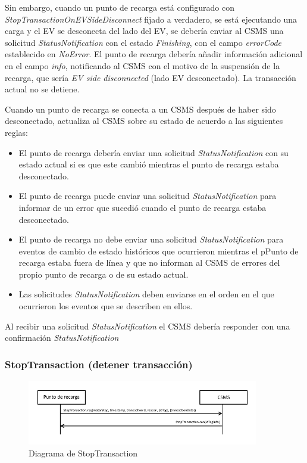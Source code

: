 \documentclass[12pt,a4paper,onecolumn,oneside]{report}
\begin{document}
Sin embargo, cuando un punto de recarga está configurado con \textit{StopTransactionOnEVSideDisconnect} fijado a verdadero, se
está ejecutando una carga y el EV se desconecta del lado del EV, se debería enviar al CSMS una solicitud \textit{StatusNotification} con el estado \textit{Finishing}, con el campo \textit{errorCode} establecido en \textit{NoError}. El punto de recarga debería añadir información adicional en el campo \textit{info}, notificando al CSMS con el motivo de la suspensión de la recarga, que sería \textit{EV side disconnected} (lado EV desconectado). La transacción actual no se detiene.

Cuando un punto de recarga se conecta a un CSMS después de haber sido desconectado, actualiza al CSMS sobre su estado de acuerdo a las siguientes reglas:

\begin{itemize}
\item El punto de recarga debería enviar una solicitud \textit{StatusNotification} con su estado actual si es que este cambió mientras el punto de recarga estaba desconectado.
\item El punto de recarga puede enviar una solicitud \textit{StatusNotification} para informar de un error que sucedió cuando el punto de recarga estaba desconectado.
\item El punto de recarga no debe enviar una solicitud \textit{StatusNotification} para eventos de cambio de estado históricos que
ocurrieron mientras el pPunto de recarga estaba fuera de línea y que no informan al CSMS de errores del propio punto de recarga o de su estado actual.
\item Las solicitudes \textit{StatusNotification} deben enviarse en el orden en el que ocurrieron los eventos que se describen en ellos.

\end{itemize}

Al recibir una solicitud \textit{StatusNotification} el CSMS debería responder con una confirmación \textit{StatusNotification}

\subsubsection{StopTransaction (detener transacción)}
\label{StopTransaction (detener transacción)}


\begin{figure}[h] 
\centering
  \includegraphics[width=0.9\textwidth]{figuras/diagramastoptransaction.png}
  \caption[Diagrama de \textit{StopTransaction}]{Diagrama de StopTransaction\\
  }
  \label{fig:diagramastoptransaction}
\end{figure}
\end{document}
